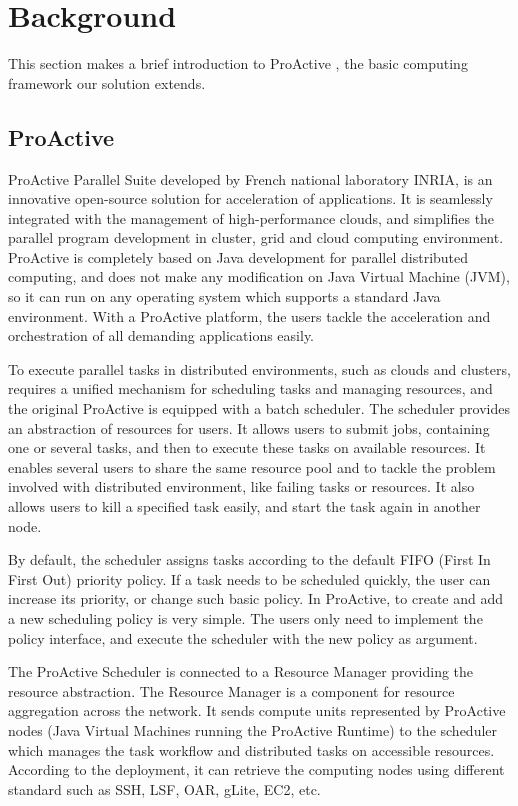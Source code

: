 \section{Background}

This section makes a brief introduction to ProActive \cite{huet04high}, the basic computing framework our solution extends.

\subsection{ProActive}

ProActive Parallel Suite developed by French national laboratory INRIA, is an innovative open-source solution for acceleration of applications. It is seamlessly integrated with the management of high-performance clouds, and simplifies the parallel program development in cluster, grid and cloud computing environment. ProActive is completely based on Java development for parallel distributed computing, and does not make any modification on Java Virtual Machine (JVM), so it can run on any operating system which supports a standard Java environment. With a ProActive platform, the users tackle the acceleration and orchestration of all demanding applications easily. %

To execute parallel tasks in distributed environments, such as clouds and clusters, requires a unified mechanism for scheduling tasks and managing resources, and the original ProActive is equipped with a batch scheduler. %
The scheduler provides an abstraction of resources for users. It allows users to submit jobs, containing one or several tasks, and then to execute these tasks on available resources. It enables several users to share the same resource pool and to tackle the problem involved with distributed environment, like failing tasks or resources. It also allows users to kill a specified task easily, and start the task again in another node.

By default, the scheduler assigns tasks according to the default FIFO (First In First Out) priority policy. If a task needs to be scheduled quickly, the user can increase its priority, or change such basic policy. In ProActive, to create and add a new scheduling policy is very simple. The users only need to implement the policy interface, and execute the scheduler with the new policy as argument.

The ProActive Scheduler \cite{pascheduling} is connected to a Resource Manager \cite{parm} providing the resource abstraction. The Resource Manager is a component for resource aggregation across the network. It sends compute units represented by ProActive nodes (Java Virtual Machines running the ProActive Runtime)   to the scheduler which manages the task workflow and distributed tasks on accessible resources. According to the deployment, it can retrieve the computing nodes using different standard such as SSH, LSF, OAR, gLite, EC2, etc.

